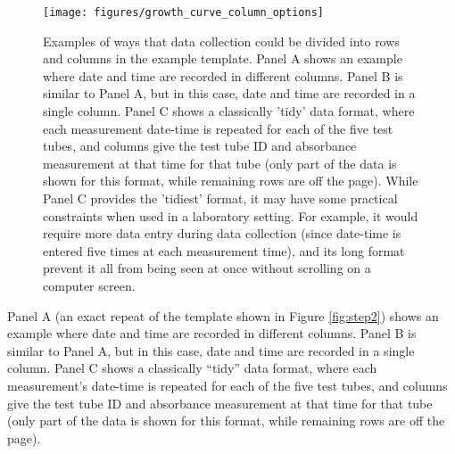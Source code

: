 \documentclass[]{tufte-book}
\begin{document}
\begin{figure}
\texttt{[image: figures/growth\_curve\_column\_options]} \caption[Examples of ways that data collection could be divided into rows and columns in the example template]{Examples of ways that data collection could be divided into rows and columns in the example template. Panel A shows an example where date and time are recorded in different columns. Panel B is similar to Panel A, but in this case, date and time are recorded in a single column. Panel C shows a classically 'tidy' data format, where each measurement date-time is repeated for each of the five test tubes, and columns give the test tube ID and absorbance measurement at that time for that tube (only part of the data is shown for this format, while remaining rows are off the page). While Panel C provides the 'tidiest' format, it may have some practical constraints when used in a laboratory setting. For example, it would require more data entry during data collection (since date-time is entered five times at each measurement time), and its long format prevent it all from being seen at once without scrolling on a computer screen.}\label{fig:columnoptions}
\end{figure}

Panel A (an exact repeat of the template shown in Figure \ref{fig:step2}) shows
an example where date and time are recorded in different columns. Panel B is
similar to Panel A, but in this case, date and time are recorded in a single
column. Panel C shows a classically ``tidy'' data format, where each measurement's
date-time is repeated for each of the five test tubes, and columns give the test
tube ID and absorbance measurement at that time for that tube (only part of the
data is shown for this format, while remaining rows are off the page).
\end{document}

